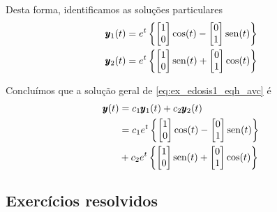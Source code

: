 \begin{ex}
  Desta forma, identificamos as soluções particulares
  \begin{align}
    \pmb{y}_1(t) &= e^t\left\{
    \begin{bmatrix}
      1\\
      0
    \end{bmatrix}\cos(t) -
    \begin{bmatrix}
      0\\
      1
    \end{bmatrix}\operatorname{sen}(t)\right\}\\
        \pmb{y}_2(t) &= e^t\left\{
    \begin{bmatrix}
      1\\
      0
    \end{bmatrix}\operatorname{sen}(t) +
    \begin{bmatrix}
      0\\
      1
    \end{bmatrix}\cos(t)\right\}
  \end{align}

  Concluímos que a solução geral de \eqref{eq:ex_edosis1_eqh_avc} é
  \begin{align}
    \pmb{y}(t) &= c_1\pmb{y}_1(t) + c_2\pmb{y}_2(t) \\
               &= c_1e^t\left\{
    \begin{bmatrix}
      1\\
      0
    \end{bmatrix}\cos(t) -
    \begin{bmatrix}
      0\\
      1
    \end{bmatrix}\operatorname{sen}(t)\right\} \\
    &+ c_2e^t\left\{
    \begin{bmatrix}
      1\\
      0
    \end{bmatrix}\operatorname{sen}(t) +
    \begin{bmatrix}
      0\\
      1
    \end{bmatrix}\cos(t)\right\}
  \end{align}
\end{ex}

\subsection*{Exercícios resolvidos}

